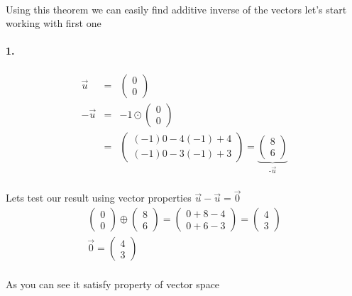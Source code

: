 \documentclass[11pt]{article}
\begin{document}
\paragraph{}Using this theorem we can easily find additive inverse of the vectors let's start working with first one
\paragraph{1.} 
\begin{eqnarray*}
\vec{u}
&=&
\begin{pmatrix}
0\\
0
\end{pmatrix}
\\
-\vec{u}
&=&
-1
\odot
\begin{pmatrix}
0\\
0
\end{pmatrix}
\\&=&
\begin{pmatrix}
(-1)0-4(-1)+4\\
(-1)0-3(-1)+3
\end{pmatrix}
=
\underbrace{
\begin{pmatrix}
8\\
6
\end{pmatrix}
}_\text{-$\vec{u}$}
\end{eqnarray*}
\paragraph{}Lets test our result using vector properties $\vec{u}-\vec{u}=\vec{0}$
\begin{eqnarray*}
\begin{pmatrix}
0\\
0
\end{pmatrix}
\oplus
\begin{pmatrix}
8\\
6
\end{pmatrix}
=
\begin{pmatrix}
0+8-4\\
0+6-3
\end{pmatrix}
=
\begin{pmatrix}
4\\
3
\end{pmatrix}
\\
\vec{0}
=
\begin{pmatrix}
4\\
3
\end{pmatrix}
\end{eqnarray*}
\paragraph{}As you can see it satisfy property of vector space
\end{document}
